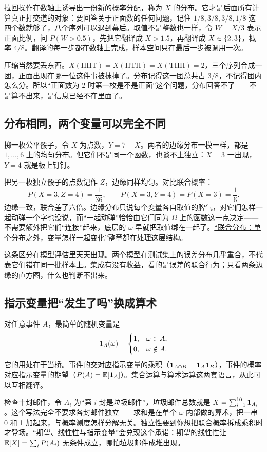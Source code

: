 拉回操作在数轴上诱导出一份新的概率分配，称为 \(X\) 的分布。它才是后面所有计算真正打交道的对象：要回答关于正面数的任何问题，记住 \(1/8,3/8,3/8,1/8\) 这四个数就够了，八个序列可以退到幕后。取值不是整数也一样，令 \(W=X/3\) 表示正面比例，问 \(P(W>0.5)\)，先把它翻译成 \(X>1.5\)，再翻译成 \(X\in\left\{2,3\right\}\)，概率 \(4/8\)。翻译的每一步都在数轴上完成，样本空间只在最后一步被调用一次。

压缩当然要丢东西。\(X(\text{HHT})=X(\text{HTH})=X(\text{THH})=2\)，三个序列合成一团，正面出现在哪一位这件事被抹掉了。分布记得这一团总共占 \(3/8\)，不记得团内怎么分。所以``正面数为 2 时第一枚是不是正面''这个问题，分布回答不了——不是算不出来，是信息已经不在里面了。

\subsection{分布相同，两个变量可以完全不同}

掷一枚公平骰子，令 \(X\) 为点数，\(Y=7-X\)。两者的边缘分布一模一样，都是 \(1,\ldots,6\) 上的均匀分布。但它们不是同一个函数，也谈不上独立：\(X=3\) 一出现，\(Y=4\) 就是板上钉钉。

把另一枚独立骰子的点数记作 \(Z\)，边缘同样均匀。对比联合概率：
\[
P(X=3,Z=4)=\frac1{36},\qquad P(X=3,Y=4)=P(X=3)=\frac16.
\]
边缘一致，联合差了六倍。边缘分布只说每个变量各自取值的脾气，对它们怎样一起动弹一个字也没说，而``一起动弹''恰恰由它们同为 \(\Omega\) 上的函数这一点决定——不需要额外把它们``连接''起来，底层的 \(\omega\) 早就把取值绑在一起了。\hyperref[ch:041]{``联合分布：单个分布之外，变量怎样一起变化''}整章都在处理这层结构。

这条区分在模型评估里天天出现。两个模型在测试集上的误差分布几乎重合，不代表它们错在同一批样本上。集成有没有收益，看的是误差的联合行为；只看两条边缘的直方图，什么也判断不出来。

\subsection{指示变量把``发生了吗''换成算术}

对任意事件 \(A\)，最简单的随机变量是
\[
\mathbf{1}_A(\omega)=\begin{cases}1,&\omega\in A,\\0,&\omega\notin A.\end{cases}
\]
它的用处在于当桥。事件的交对应指示变量的乘积（\(\mathbf{1}_{A\cap B}=\mathbf{1}_A\mathbf{1}_B\)），事件的概率对应指示变量的期望（\(P(A)=\mathbb{E}[\mathbf{1}_A]\)）。集合运算与算术运算这两套语言，从此可以互相翻译。

检查十封邮件，令 \(A_i\) 为``第 \(i\) 封是垃圾邮件''，垃圾邮件总数就是 \(X=\sum_{i=1}^{10}\mathbf{1}_{A_i}\)。这个写法完全不要求各封邮件独立——求和是在单个 \(\omega\) 内部做的算术，把一串 0 和 1 加起来，与概率测度怎样分解无关。独立性要到你想把联合概率拆成乘积时才登场。\hyperref[sec:05-Probability/04-Expectation-and-Moments/01]{``期望、线性性与指示变量''}会兑现这个承诺：期望的线性性让 \(\mathbb{E}[X]=\sum_i P(A_i)\) 无条件成立，哪怕垃圾邮件成堆出现。

